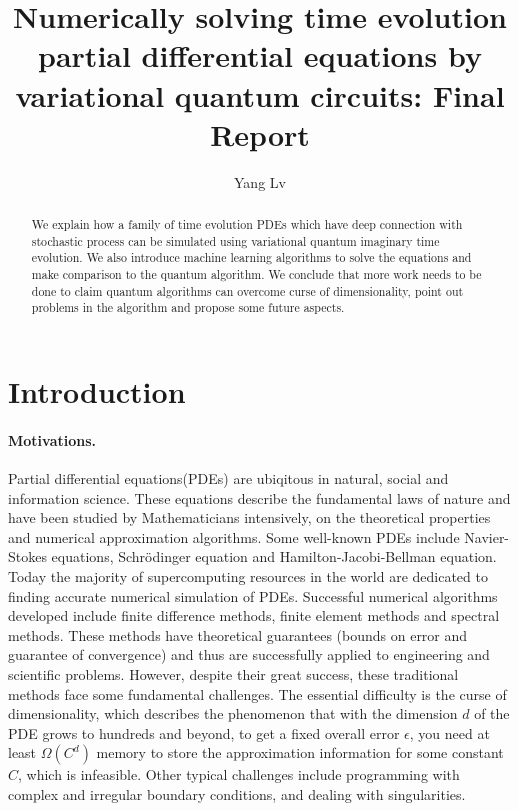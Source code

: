 \documentclass[11pt]{article}
\theoremstyle{definition}
\begin{document}
\title{Numerically solving time evolution partial differential equations by variational quantum circuits:  Final Report}

\author{Yang Lv}

\date{}
\maketitle

\begin{abstract}
We explain how a family of time evolution PDEs which have deep connection with stochastic process can be simulated using variational quantum imaginary time evolution. We also introduce machine learning algorithms to solve the equations and make comparison to the quantum algorithm. We  conclude that more work needs to be done to claim quantum algorithms can overcome curse of dimensionality, point out problems in the algorithm and propose some future aspects.
\end{abstract}


\section{Introduction}\label{sec:intro}
\paragraph{Motivations.}
Partial differential equations(PDEs) are ubiqitous in natural, social and information science. These equations describe the fundamental laws of nature  and have been studied by Mathematicians intensively, on the theoretical properties and numerical approximation algorithms. Some well-known PDEs include Navier-Stokes equations, Schrödinger equation and Hamilton-Jacobi-Bellman equation.  Today the majority of supercomputing resources in the world are dedicated to finding accurate numerical simulation of PDEs. Successful numerical algorithms developed include finite difference methods, finite element methods and spectral methods. These methods have theoretical guarantees (bounds on error and guarantee of convergence) and thus are successfully applied to engineering and scientific problems. However, despite their great success, these traditional methods face some fundamental challenges. The essential difficulty is  the curse of dimensionality\cite{e_machine_2020}, which describes the phenomenon that with the dimension $d$ of the PDE grows to hundreds and beyond, to get a fixed overall error $\epsilon$, you need at least $\Omega(C^d)$ memory to store the approximation information for some constant $C$, which is infeasible. Other typical challenges include programming with complex and irregular boundary conditions, and dealing with singularities.\\
\end{document}
